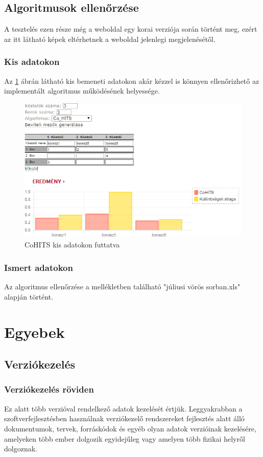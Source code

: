 \documentclass[12pt]{report}
\theoremstyle{definition}
\begin{document}
	\section{Algoritmusok ellenőrzése}
	A tesztelés ezen része még a weboldal egy korai verziója során történt meg, ezért az itt látható képek eltérhetnek a weboldal jelenlegi megjelenésétől.
	
	\subsection*{Kis adatokon}
	Az \ref{fig:algoritmus_kis_adatok} ábrán látható kis bemeneti adatokon akár kézzel is könnyen ellenőrizhető az implementált algoritmus működésének helyessége.
	\begin{figure}[!ht]
		\centering
		\includegraphics[width=0.7\linewidth]{algoritmus_kis_adatok}
		\caption[CoHITS kis adatokon futtatva]{CoHITS kis adatokon futtatva}
		\label{fig:algoritmus_kis_adatok}
	\end{figure}
	
	\subsection*{Ismert adatokon}
	Az algoritmus ellenőrzése a mellékletben található "júliusi vörös sorban.xls" alapján történt.
	
	\chapter{Egyebek}
	\section{Verziókezelés}
	
	\subsection*{Verziókezelés röviden}
	Ez alatt több verzióval rendelkező adatok kezelését értjük. Leggyakrabban a szoftverfejlesztésben használnak verziókezelő rendszereket fejlesztés alatt álló dokumentumok, tervek, forráskódok és egyéb olyan adatok verzióinak kezelésére, amelyeken több ember dolgozik egyidejűleg vagy amelyen több fizikai helyről dolgoznak.
	
\end{document}

